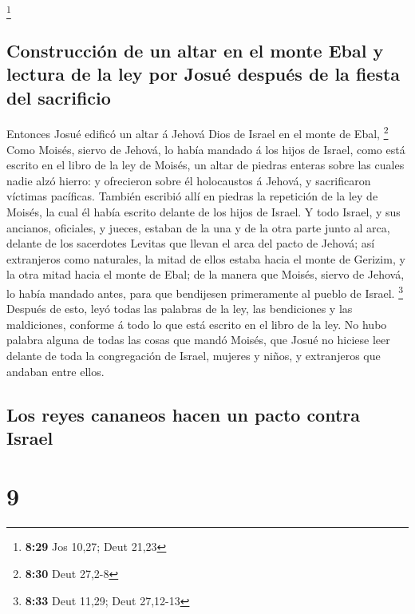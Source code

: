 \footnote{\textbf{8:29} Jos 10,27; Deut 21,23}

\hypertarget{construcciuxf3n-de-un-altar-en-el-monte-ebal-y-lectura-de-la-ley-por-josuuxe9-despuuxe9s-de-la-fiesta-del-sacrificio}{%
\subsection{Construcción de un altar en el monte Ebal y lectura de la
ley por Josué después de la fiesta del
sacrificio}\label{construcciuxf3n-de-un-altar-en-el-monte-ebal-y-lectura-de-la-ley-por-josuuxe9-despuuxe9s-de-la-fiesta-del-sacrificio}}

 Entonces Josué edificó un altar á Jehová Dios de Israel en
el monte de Ebal, \footnote{\textbf{8:30} Deut 27,2-8} 
Como Moisés, siervo de Jehová, lo había mandado á los hijos de Israel,
como está escrito en el libro de la ley de Moisés, un altar de piedras
enteras sobre las cuales nadie alzó hierro: y ofrecieron sobre él
holocaustos á Jehová, y sacrificaron víctimas pacíficas. 
También escribió allí en piedras la repetición de la ley de Moisés, la
cual él había escrito delante de los hijos de Israel.  Y
todo Israel, y sus ancianos, oficiales, y jueces, estaban de la una y de
la otra parte junto al arca, delante de los sacerdotes Levitas que
llevan el arca del pacto de Jehová; así extranjeros como naturales, la
mitad de ellos estaba hacia el monte de Gerizim, y la otra mitad hacia
el monte de Ebal; de la manera que Moisés, siervo de Jehová, lo había
mandado antes, para que bendijesen primeramente al pueblo de Israel.
\footnote{\textbf{8:33} Deut 11,29; Deut 27,12-13}  Después
de esto, leyó todas las palabras de la ley, las bendiciones y las
maldiciones, conforme á todo lo que está escrito en el libro de la ley.
 No hubo palabra alguna de todas las cosas que mandó
Moisés, que Josué no hiciese leer delante de toda la congregación de
Israel, mujeres y niños, y extranjeros que andaban entre ellos.

\hypertarget{los-reyes-cananeos-hacen-un-pacto-contra-israel}{%
\subsection{Los reyes cananeos hacen un pacto contra
Israel}\label{los-reyes-cananeos-hacen-un-pacto-contra-israel}}

\hypertarget{section-8}{%
\section{9}\label{section-8}}


